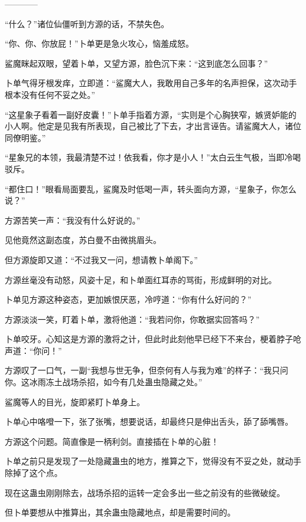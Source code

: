 
\begin{this_body}

------------

“什么？”诸位仙僵听到方源的话，不禁失色。

“你、你、你放屁！”卜单更是急火攻心，恼羞成怒。

鲨魔眯起双眼，望着卜单，又望方源，脸色沉下来：“这到底怎么回事？”

卜单气得牙根发痒，立即道：“鲨魔大人，我敢用自己多年的名声担保，这次动手根本没有任何不妥之处。”

“这星象子看着一副好皮囊！”卜单手指着方源，“实则是个心胸狭窄，嫉贤妒能的小人啊。他定是见我有所表现，自己被比了下去，才出言诬告。请鲨魔大人，诸位同僚明鉴。”

“星象兄的本领，我最清楚不过！依我看，你才是小人！”太白云生气极，当即冷喝驳斥。

“都住口！”眼看局面要乱，鲨魔及时低喝一声，转头面向方源，“星象子，你怎么说？”

方源苦笑一声：“我没有什么好说的。”

见他竟然这副态度，苏白曼不由微挑眉头。

但方源旋即又道：“不过我又一问，想请教卜单阁下。”

方源丝毫没有动怒，风姿十足，和卜单面红耳赤的骂街，形成鲜明的对比。

卜单见方源这种姿态，更加嫉恨厌恶，冷哼道：“你有什么好问的？”

方源淡淡一笑，盯着卜单，激将他道：“我若问你，你敢据实回答吗？”

卜单咬牙。心知这是方源的激将之计，但此时此刻他早已经下不来台，梗着脖子呛声道：“你问！”

方源叹了一口气，一副“我想与世无争，但奈何有人与我为难”的样子：“我只问你。这冰雨冻土战场杀招，如今有几处蛊虫隐藏之处。”

鲨魔等人的目光，旋即紧盯卜单身上。

卜单心中咯噔一下，张了张嘴，想要说话，却最终只是伸出舌头，舔了舔嘴唇。

方源这个问题。简直像是一柄利剑。直接插在卜单的心脏！

卜单之前只是发现了一处隐藏蛊虫的地方，推算之下，觉得没有不妥之处，就动手除掉了这个点。

现在这蛊虫刚刚除去，战场杀招的运转一定会多出一些之前没有的些微破绽。

但卜单要想从中推算出，其余蛊虫隐藏地点，却是需要时间的。


\end{this_body}
